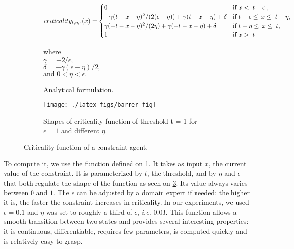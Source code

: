\begin{figure}
	\centering
	\begin{subfigure}[b]{\textwidth}
	  \centering
	  \scriptsize
	  
		\[criticality_{t,\eta,\epsilon}(x)=
			\begin{cases}
				0		&\text{if \( x < \; t - \epsilon \) },\\
				-\gamma ( t - x - \eta ) ^ 2 / ( 2 ( \epsilon - \eta)) + \gamma ( t - x - \eta ) + \delta &\text{if \(t - \epsilon \leq \;x \leq \;t - \eta \)},\\
				\gamma (-t-x-\eta)^2/(2 \eta)+\gamma (-t-x-\eta) + \delta &\text{if \(t - \eta \leq \;x \leq \;t\)},\\
				1	&\text{if \( x > \; t \)}
			\end{cases}\]

		where\\
		$\gamma = -2/ \epsilon,$\\
		$\delta = -\gamma (\epsilon - \eta )/2,$\\
		$\text{and } 0 < \eta < \epsilon.$
	  \caption{Analytical formulation.}\label{crit_func}
	\end{subfigure}
	
	\begin{subfigure}[b]{\textwidth}
		\centering
		\texttt{[image: ./latex\_figs/barrer-fig]}
		\caption{Shapes of criticality function of threshold t = 1 for \(\epsilon=1\) and different \(\eta\).}\label{crit_shapes}
	\end{subfigure}
	
\caption{Criticality function of a constraint agent.}
\end{figure}

To compute it, we use the function defined on \figurename{} \ref{crit_func}. It takes as input \(x\), the current value of the constraint. It is parameterized by \(t\), the threshold, and by \(\eta\) and \(\epsilon\) that both regulate the shape of the function as seen on \figurename{} \ref{crit_shapes}. Its value always varies between \(0\) and \(1\).
The \(\epsilon\) can be adjusted by a domain expert if needed: the higher it is, the faster the constraint increases in criticality.
In our experiments, we used $\epsilon = 0.1$ and  $\eta$ was set to roughly a third of $\epsilon$, \textit{i.e.} 0.03.
This function allows a smooth transition between two states and provides several interesting properties: it is continuous, differentiable, requires few parameters, is computed quickly and is relatively easy to grasp.


